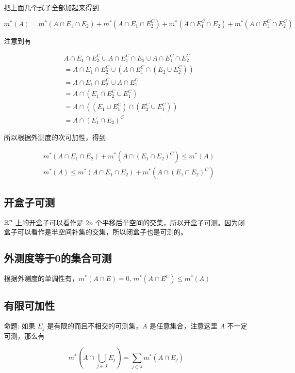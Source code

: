 把上面几个式子全部加起来得到

\[
m^*(A) = m^*(A \cap E_1 \cap E_2) + m^*(A \cap E_1 \cap E_2^{C}) + m^*(A \cap E_1^{C} \cap E_2) + m^*(A \cap E_1^{C} \cap E_2^C)
\]

注意到有 

\begin{align*}
&A \cap E_1 \cap E_2^{C} \cup A \cap E_1^{C} \cap E_2 \cup A \cap E_1^{C} \cap E_2^C \\
&= A \cap E_1 \cap E_2^{C} \cup (A \cap E_1^{C} \cap (E_2 \cup E_2^C)) \\
&= A \cap E_1 \cap E_2^{C} \cup A \cap E_1 ^C \\
&=  A \cap (E_1 \cap E_2^C \cup E_1^C) \\
& = A \cap ((E_1 \cup E_1^C) \cap (E_2^C \cup E_1^C)) \\
& = A \cap (E_1 \cap E_2)^C
\end{align*}


所以根据外测度的次可加性，得到

\begin{align*}
 & m^*(A \cap E_1 \cap E_2) + m^*(A \cap (E_1 \cap E_2)^C) \le m^*(A) \\
 & m^*(A) \le  m^*(A \cap E_1 \cap E_2) + m^*(A \cap (E_1 \cap E_2)^C)
\end{align*}

\subsection{开盒子可测}

$\mathbb{R}^n$ 上的开盒子可以看作是 $2n$ 个平移后半空间的交集，所以开盒子可测。因为闭盒子可以看作是半空间补集的交集，所以闭盒子也是可测的。

\subsection{外测度等于0的集合可测}

根据外测度的单调性有，$m^*(A \cap E) = 0,\, m^*(A \cap E^C) \le m^*(A)$

\subsection{有限可加性}

命题: 如果 $E_j$ 是有限的而且不相交的可测集，$A$ 是任意集合，注意这里 $A$ 不一定可测，那么有

\[
m^*(A \cap \bigcup_{j \in J}E_j) = \sum_{j \in J}m^*(A \cap E_j)
\]

